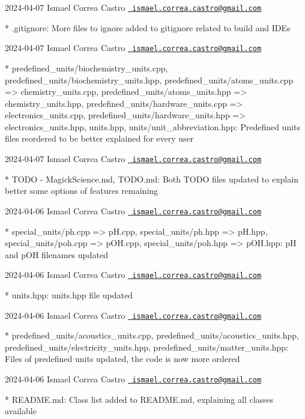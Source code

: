  2024-\/04-\/07 Ismael Correa Castro \href{mailto:ismael.correa.castro@gmail.com}{\texttt{ ismael.\+correa.\+castro@gmail.\+com}} \begin{DoxyVerb}* .gitignore: More files to ignore added to gitignore related to
build and IDEs
\end{DoxyVerb}
 2024-\/04-\/07 Ismael Correa Castro \href{mailto:ismael.correa.castro@gmail.com}{\texttt{ ismael.\+correa.\+castro@gmail.\+com}} \begin{DoxyVerb}* predefined_units/biochemistry_units.cpp,
predefined_units/biochemistry_units.hpp,
predefined_units/{atoms_units.cpp => chemistry_units.cpp},
predefined_units/{atoms_units.hpp => chemistry_units.hpp},
predefined_units/{hardware_units.cpp => electronics_units.cpp},
predefined_units/{hardware_units.hpp => electronics_units.hpp},
units.hpp, units/unit_abbreviation.hpp: Predefined units files
reordered to be better explained for every user
\end{DoxyVerb}
 2024-\/04-\/07 Ismael Correa Castro \href{mailto:ismael.correa.castro@gmail.com}{\texttt{ ismael.\+correa.\+castro@gmail.\+com}} \begin{DoxyVerb}* TODO - MagickScience.md, TODO.md: Both TODO files updated to
explain better some options of features remaining
\end{DoxyVerb}
 2024-\/04-\/06 Ismael Correa Castro \href{mailto:ismael.correa.castro@gmail.com}{\texttt{ ismael.\+correa.\+castro@gmail.\+com}} \begin{DoxyVerb}* special_units/{ph.cpp => pH.cpp}, special_units/{ph.hpp =>
pH.hpp}, special_units/{poh.cpp => pOH.cpp}, special_units/{poh.hpp
=> pOH.hpp}: pH and pOH filenames updated
\end{DoxyVerb}
 2024-\/04-\/06 Ismael Correa Castro \href{mailto:ismael.correa.castro@gmail.com}{\texttt{ ismael.\+correa.\+castro@gmail.\+com}} \begin{DoxyVerb}* units.hpp: units.hpp file updated
\end{DoxyVerb}
 2024-\/04-\/06 Ismael Correa Castro \href{mailto:ismael.correa.castro@gmail.com}{\texttt{ ismael.\+correa.\+castro@gmail.\+com}} \begin{DoxyVerb}* predefined_units/acoustics_units.cpp,
predefined_units/acoustics_units.hpp,
predefined_units/electricity_units.hpp,
predefined_units/matter_units.hpp: Files of predefined units
updated, the code is now more ordered
\end{DoxyVerb}
 2024-\/04-\/06 Ismael Correa Castro \href{mailto:ismael.correa.castro@gmail.com}{\texttt{ ismael.\+correa.\+castro@gmail.\+com}} \begin{DoxyVerb}* README.md: Class list added to README.md, explaining all classes
available
\end{DoxyVerb}
